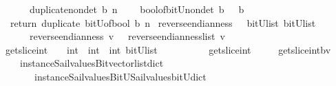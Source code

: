 \begin{isabellebody}
\ \ \ \ \ {\isachardoublequoteopen}\ duplicate{\isacharunderscore}nondet\ b\ n\ {\isacharequal}\ {\isacharparenleft}\isanewline
\ \ bool{\isacharunderscore}of{\isacharunderscore}bitU{\isacharunderscore}nondet\ b\ {\isasymbind}\ {\isacharparenleft}{\isasymlambda}\ b\ {\isachardot}\ \isanewline
\ \ return\ {\isacharparenleft}duplicate\ {\isacharparenleft}bitU{\isacharunderscore}of{\isacharunderscore}bool\ b{\isacharparenright}\ n{\isacharparenright}{\isacharparenright}{\isacharparenright}{\isachardoublequoteclose}\isanewline
\isanewline
\isanewline
%
\isanewline
{}\isamarkupfalse%
\ reverse{\isacharunderscore}endianness\ \ {\isacharcolon}{\isacharcolon}\ {\isachardoublequoteopen}{\isacharparenleft}bitU{\isacharparenright}list\ {\isasymRightarrow}{\isacharparenleft}bitU{\isacharparenright}list\ {\isachardoublequoteclose}\ \ \ \isanewline
\ \ \ \ \ {\isachardoublequoteopen}\ reverse{\isacharunderscore}endianness\ v\ {\isacharequal}\ {\isacharparenleft}\ reverse{\isacharunderscore}endianness{\isacharunderscore}list\ v\ {\isacharparenright}{\isachardoublequoteclose}\isanewline
\isanewline
\isanewline
%
\isanewline
{}\isamarkupfalse%
\ get{\isacharunderscore}slice{\isacharunderscore}int\ \ {\isacharcolon}{\isacharcolon}\ {\isachardoublequoteopen}\ int\ {\isasymRightarrow}\ int\ {\isasymRightarrow}\ int\ {\isasymRightarrow}{\isacharparenleft}bitU{\isacharparenright}list\ {\isachardoublequoteclose}\ \ \ \isanewline
\ \ \ \ \ {\isachardoublequoteopen}\ get{\isacharunderscore}slice{\isacharunderscore}int\ {\isacharequal}\ {\isacharparenleft}\ \isanewline
\ \ get{\isacharunderscore}slice{\isacharunderscore}int{\isacharunderscore}bv\isanewline
\ \ \ \ {\isacharparenleft}instance{\isacharunderscore}Sail{}{\isacharunderscore}values{\isacharunderscore}Bitvector{\isacharunderscore}list{\isacharunderscore}dict\isanewline
\ \ \ \ \ \ \ instance{\isacharunderscore}Sail{}{\isacharunderscore}values{\isacharunderscore}BitU{\isacharunderscore}Sail{}{\isacharunderscore}values{\isacharunderscore}bitU{\isacharunderscore}dict{\isacharparenright}\ {\isacharparenright}{\isachardoublequoteclose}\isanewline

\end{isabellebody}
